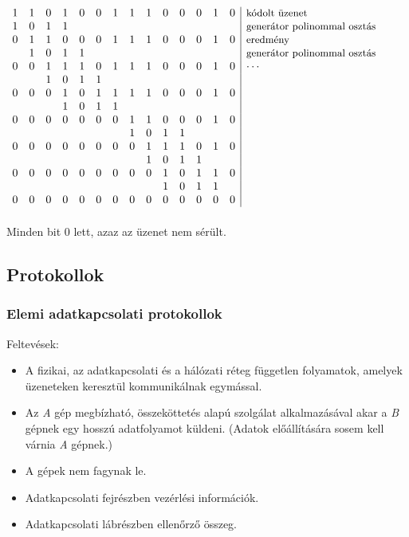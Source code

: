 \documentclass[12pt]{article}
\begin{document}
    $\begin{array}{cccccccccccccc|l}
        1&1&0&1&0&0&1&1&1&0&0&0&1&0&\text{\small kódolt üzenet} \\
        1&0&1&1& & & & & & & & & & &\text{\small generátor polinommal osztás} \\
        0&1&1&0&0&0&1&1&1&0&0&0&1&0&\text{\small eredmény} \\
         &1&0&1&1& & & & & & & & & &\text{\small generátor polinommal osztás} \\
        0&0&1&1&1&0&1&1&1&0&0&0&1&0& \cdots \\
         & &1&0&1&1& & & & & & & & &  \\
        0&0&0&1&0&1&1&1&1&0&0&0&1&0&  \\
         & & &1&0&1&1& & & & & & & &  \\
        0&0&0&0&0&0&0&1&1&0&0&0&1&0&  \\
         & & & & & & &1&0&1&1& & & &  \\
        0&0&0&0&0&0&0&0&1&1&1&0&1&0&  \\
         & & & & & & & &1&0&1&1& & &  \\
        0&0&0&0&0&0&0&0&0&1&0&1&1&0&  \\
        & & & & & & & & & 1&0&1&1& &  \\
        0&0&0&0&0&0&0&0&0&0&0&0&0&0&  \\
    \end{array}$\\\\

    \noindent Minden bit 0 lett, azaz az üzenet nem sérült.

\newpage
	\subsection*{Protokollok}

    \subsubsection*{Elemi adatkapcsolati protokollok\\}

    \noindent Feltevések:
     \begin{itemize}[leftmargin=7.5mm]
        \renewcommand{\labelitemi}{$\vcenter{\hbox{\tiny$\bullet$}}$}
        \item A fizikai, az adatkapcsolati és a hálózati réteg független folyamatok, amelyek üzeneteken keresztül kommunikálnak egymással.
        \item Az \emph{A} gép megbízható, összeköttetés alapú szolgálat alkalmazásával akar a \emph{B} gépnek egy hosszú adatfolyamot küldeni. (Adatok előállítására sosem kell várnia \emph{A} gépnek.)
        \item A gépek nem fagynak le.
        \item Adatkapcsolati fejrészben vezérlési információk.
        \item Adatkapcsolati lábrészben ellenőrző összeg.
    \end{itemize}
\end{document}
